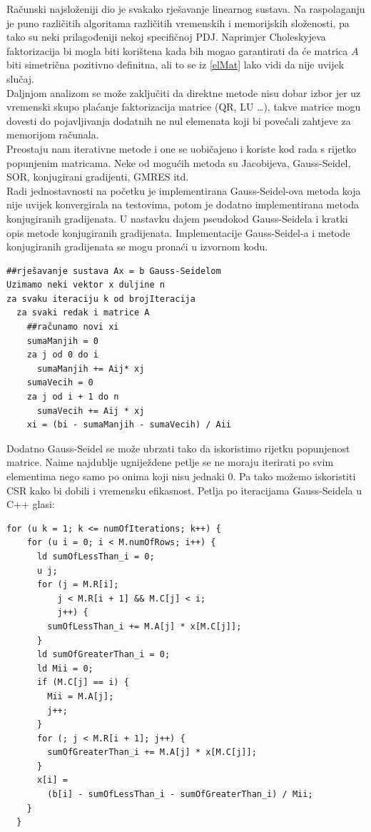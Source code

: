 \documentclass[zavrsnirad]{../fer}
\begin{document}
Računski najsloženiji dio je svakako rješavanje linearnog 
sustava. Na raspolaganju je puno različitih algoritama različitih 
vremenskih i memorijskih složenosti,
pa tako su neki prilagođeniji nekoj specifičnoj PDJ.
Naprimjer Choleskyjeva faktorizacija bi mogla biti korištena kada
bih mogao garantirati da će matrica $A$ biti simetrična pozitivno 
definitna, ali to se iz \ref{elMat} 
lako vidi da nije uvijek slučaj.
\bigskip
\\ 
Daljnjom analizom se može zaključiti da direktne metode nisu dobar
izbor jer uz vremenski skupo plaćanje faktorizacija matrice (QR, LU \dots),
takve matrice mogu dovesti do pojavljivanja dodatnih ne nul elemenata 
koji bi povećali zahtjeve za memorijom računala.
\bigskip
\\ 
Preostaju nam iterativne metode i one se uobičajeno i koriste kod 
rada s rijetko popunjenim matricama. Neke od mogućih metoda su 
Jacobijeva, Gauss-Seidel, SOR, konjugirani gradijenti, GMRES itd.
\bigskip
\\
Radi jednostavnosti na početku je implementirana Gauss-Seidel-ova metoda 
koja nije uvijek konvergirala na testovima, potom je dodatno implementirana 
metoda konjugiranih gradijenata.
U nastavku dajem pseudokod Gauss-Seidela i kratki 
opis metode konjugiranih gradijenata. Implementacije Gauss-Seidel-a i
metode konjugiranih gradijenata se mogu pronaći u izvornom kodu.
\begin{verbatim}
##rješavanje sustava Ax = b Gauss-Seidelom
Uzimamo neki vektor x duljine n
za svaku iteraciju k od brojIteracija
  za svaki redak i matrice A
    ##računamo novi xi
    sumaManjih = 0
    za j od 0 do i 
      sumaManjih += Aij* xj
    sumaVecih = 0
    za j od i + 1 do n
      sumaVecih += Aij * xj
    xi = (bi - sumaManjih - sumaVecih) / Aii 
\end{verbatim}
Dodatno Gauss-Seidel se može ubrzati tako da iskoristimo rijetku popunjenost
matrice. Naime najdublje ugniježdene petlje se ne moraju iterirati po svim elementima
nego samo po onima koji nisu jednaki $0$. Pa tako možemo iskoristiti CSR kako
bi dobili i vremensku efikasnost. Petlja po iteracijama Gauss-Seidela u C++ glasi:
\begin{verbatim}
for (u k = 1; k <= numOfIterations; k++) {
    for (u i = 0; i < M.numOfRows; i++) {
      ld sumOfLessThan_i = 0;
      u j;
      for (j = M.R[i];
          j < M.R[i + 1] && M.C[j] < i;
          j++) {
        sumOfLessThan_i += M.A[j] * x[M.C[j]];
      }
      ld sumOfGreaterThan_i = 0;
      ld Mii = 0;
      if (M.C[j] == i) {
        Mii = M.A[j];
        j++;
      } 
      for (; j < M.R[i + 1]; j++) {
        sumOfGreaterThan_i += M.A[j] * x[M.C[j]];
      }
      x[i] = 
        (b[i] - sumOfLessThan_i - sumOfGreaterThan_i) / Mii; 
    }
  }
\end{verbatim}
\end{document}
